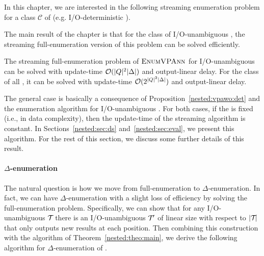  
In this chapter, we are interested in the following streaming enumeration problem for a class $\mathcal{C}$ of \vpann (e.g. I/O-deterministic \vpann).
\begin{center}
\end{center}
The main result of the chapter is that for the class of I/O-unambiguous \vpann, the streaming full-enumeration version of this problem can be solved efficiently. %
\begin{theorem}\label{nested:theo:main}
	The streaming full-enumeration problem of $\textsc{EnumVPAnn}$ for I/O-unambiguous \vpann can be solved with update-time $\mathcal{O}(|Q|^2\vert\Delta\vert)$ and output-linear delay. For the class of all \vpann, it can be solved with update-time $\mathcal{O}(2^{|Q|^2\vert\Delta\vert})$ and output-linear \nolinebreak delay. 
\end{theorem} 
The general case is basically a consequence of Proposition~\ref{nested:vpawo:det} and the enumeration algorithm for I/O-unambiguous \vpann. For both cases, if the \vpann is fixed (i.e., in data complexity), then the update-time of the streaming algorithm is constant. In Sections~\ref{nested:sec:ds} and~\ref{nested:sec:eval}, we present this algorithm. For the rest of this section, we discuss some further details of this result.

\paragraph{$\Delta$-enumeration} The natural question is how we move from full-enumeration to $\Delta$-enumeration. In fact, we can have $\Delta$-enumeration with a slight loss of efficiency by solving the full-enumeration problem. Specifically, we can show that for any I/O-unambiguous \vpann $\mathcal{T}\!$ there is an I/O-unambiguous \vpann $\mathcal{T}\!'$ of linear size with respect to $|\mathcal{T}\!|$ that only outputs new results at each position. Then combining this construction with the algorithm of Theorem~\ref{nested:theo:main}, we derive the following algorithm for $\Delta$-enumeration of \vpann.

